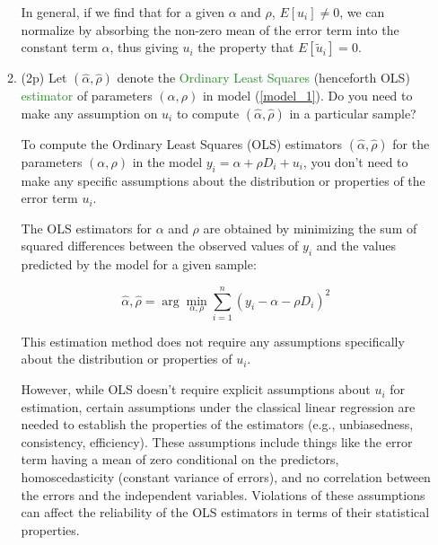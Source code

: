 \documentclass{article}
\newcommand{\gap}{\vspace{1 em}}
\begin{document}
\begin{enumerate}[label=\textbf{Q\arabic{enumi}}.,ref=Q\arabic{enumi}, wide=0pt, itemsep=1em, topsep=5pt]
\begin{enumerate}
\begin{solution}
{                \gap
                In general, if we find that for a given $\alpha$ and $\rho$, $E[u_i] \neq 0$, we can normalize by absorbing the non-zero mean of the error term into the constant term $\alpha$, thus giving $u_i$ the property that $E[\tilde{u}_i] = 0$.
            }
        \end{solution}
        \gap
        \item (2p) Let $\left( \widehat{\alpha },\widehat{\rho }\right) $ denote the \textcolor{ForestGreen}{Ordinary Least Squares} (henceforth OLS) \textcolor{ForestGreen}{estimator} of parameters $\left(\alpha ,\rho \right)$ in model (\ref{model_1}). Do you need to make any assumption on $u _{i}$ to compute $\left( \widehat{\alpha },\widehat{\rho }\right) $ in a particular sample?
        \begin{solution}
            {
                To compute the Ordinary Least Squares (OLS) estimators $\left(\widehat{\alpha}, \widehat{\rho}\right)$ for the parameters $\left(\alpha, \rho\right)$ in the model \(y_{i} = \alpha + \rho D_{i} + u_{i}\), you don't need to make any specific assumptions about the distribution or properties of the error term \(u_{i}\). \gap

                The OLS estimators for \(\alpha\) and \(\rho\) are obtained by minimizing the sum of squared differences between the observed values of \(y_{i}\) and the values predicted by the model for a given sample:
                
                \[\widehat{\alpha}, \widehat{\rho} = \arg \min_{\alpha, \rho} \sum_{i=1}^{n} \left(y_{i} - \alpha - \rho D_{i}\right)^{2}\]

                This estimation method does not require any assumptions specifically about the distribution or properties of \(u_{i}\).

                \gap

                However, while OLS doesn't require explicit assumptions about \(u_{i}\) for estimation, certain assumptions under the classical linear regression are needed to establish the properties of the estimators (e.g., unbiasedness, consistency, efficiency). These assumptions include things like the error term having a mean of zero conditional on the predictors, homoscedasticity (constant variance of errors), and no correlation between the errors and the independent variables. Violations of these assumptions can affect the reliability of the OLS estimators in terms of their statistical properties.
            }
        \gap
        \end{solution}
        

\end{enumerate}
\end{enumerate}
\end{document}
